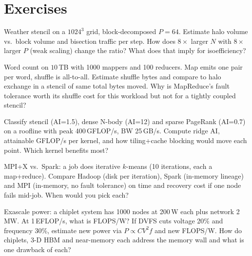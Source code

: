\section{Exercises}
\begin{exercise}Weather stencil on a $1024^3$ grid, block-decomposed $P=64$. Estimate halo volume vs.\ block volume and bisection traffic per step. How does $8\times$ larger $N$ with $8\times$ larger $P$ (weak scaling) change the ratio? What does that imply for isoefficiency?\end{exercise}
\begin{exercise}Word count on $10$\,TB with 1000 mappers and 100 reducers. Map emits one pair per word, shuffle is all-to-all. Estimate shuffle bytes and compare to halo exchange in a stencil of same total bytes moved. Why is MapReduce's fault tolerance worth its shuffle cost for this workload but not for a tightly coupled stencil?\end{exercise}
\begin{exercise}Classify stencil (AI=1.5), dense N-body (AI=12) and sparse PageRank (AI=0.7) on a roofline with peak 400\,GFLOP/s, BW 25\,GB/s. Compute ridge AI, attainable GFLOP/s per kernel, and how tiling+cache blocking would move each point. Which kernel benefits most?\end{exercise}
\begin{exercise}MPI+X vs.\ Spark: a job does iterative $k$-means (10 iterations, each a map+reduce). Compare Hadoop (disk per iteration), Spark (in-memory lineage) and MPI (in-memory, no fault tolerance) on time and recovery cost if one node fails mid-job. When would you pick each?\end{exercise}
\begin{exercise}Exascale power: a chiplet system has 1000 nodes at 200\,W each plus network 2\,MW. At 1\,EFLOP/s, what is FLOPS/W? If DVFS cuts voltage 20\% and frequency 30\%, estimate new power via $P\propto CV^2f$ and new FLOPS/W. How do chiplets, 3-D HBM and near-memory each address the memory wall and what is one drawback of each?\end{exercise}